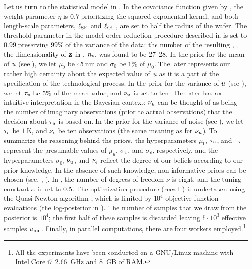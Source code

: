 Let us turn to the statistical model in . In the covariance function given by , the weight parameter $\eta$ is 0.7 prioritizing the squared exponential kernel, and both length-scale parameters, $\ell_{\text{SE}}$ and $\ell_{\text{OU}}$, are set to half the radius of the wafer. The threshold parameter in the model order reduction procedure described in  is set to $0.99$ preserving $99\%$ of the variance of the data; the number of the resulting \rvs, \ie, the dimensionality of $\mathbf{z}$ in , ${n_\text{v}}$, was found to be 27--28.
In the prior for the mean of $u$ (see ), we let $\mu_0$ be $45~\text{nm}$ and $\sigma_0$ be $1\%$ of $\mu_0$. The later represents our rather high certainty about the expected value of $u$ as it is a part of the specification of the technological process.
In the prior for the variance of $u$ (see ), we let $\tau_u$ be $5\%$ of the mean value, and $\nu_u$ is set to ten. The later has an intuitive interpretation in the Bayesian context: $\nu_u$ can be thought of as being the number of imaginary observations (prior to actual observations) that the decision about $\tau_u$ is based on.
In the prior for the variance of noise (see ), we let $\tau_\epsilon$ be $1~\text{K}$, and $\nu_\epsilon$ be ten observations (the same meaning as for $\nu_u$).
To summarize the reasoning behind the priors, the hyperparameters $\mu_0$, $\tau_u$, and $\tau_u$ represent the presumable values of $\mu_u$, $\sigma_u$, and $\sigma_\epsilon$, respectively, and the hyperparameters $\sigma_0$, $\nu_u$, and $\nu_\epsilon$ reflect the degree of our beliefs according to our prior knowledge. In the absence of such knowledge, non-informative priors can be chosen (see, \eg, \cite{gelman2004}).
In , the number of degrees of freedom $\nu$ is eight, and the tuning constant $\alpha$ is set to 0.5.
The optimization procedure (recall ) is undertaken using the Quasi-Newton algorithm \cite{press2007}, which is limited by $10^4$ objective function evaluations (the log-posterior in ).
The number of samples that we draw from the posterior is $10^4$; the first half of these samples is discarded leaving $5 \cdot 10^3$ effective samples ${n_\text{mc}}$.
Finally, in parallel computations, there are four workers employed.\footnote{All the experiments have been conducted on a GNU/Linux machine with Intel Core i7 2.66~GHz and 8~GB of RAM.}


